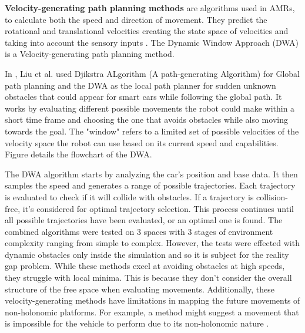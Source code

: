 \textbf{Velocity-generating path planning methods} are algorithms used in AMRs, to calculate both 
the speed and direction of movement. They predict the rotational and translational velocities 
creating the state space of velocities and taking into account the sensory inputs \cite{R28}. 
The Dynamic Window Approach (DWA) is a Velocity-generating path planning method.

In \cite{R19}, Liu et al. used Djikstra ALgorithm (A path-generating Algorithm) 
for Global path planning and 
the DWA as the local path planner for sudden unknown obstacles that could 
appear for smart cars while following the global path.
It works by evaluating different possible movements the robot could make within a short time frame 
and choosing the one that avoids obstacles while also moving towards the goal. The "window" refers 
to a limited set of possible velocities of the velocity space the robot can use based on its current 
speed and capabilities. Figure  details the flowchart of the DWA. 

The DWA algorithm starts by analyzing the car's position and base data. It then samples the speed and 
generates a range of possible trajectories. Each trajectory is evaluated to check if it will collide with 
obstacles. If a trajectory is collision-free, it's considered for optimal trajectory selection. This process 
continues until all possible trajectories have been evaluated, or an optimal one is found.
The combined algorithms were tested on 3 spaces with 3 stages of environment complexity ranging from 
simple to complex. However, the tests were effected with dynamic obstacles only inside the simulation and
so it is subject for the reality gap problem.
While these methods excel at avoiding obstacles at high speeds, they struggle with local minima. This is 
because they don't consider the overall structure of the free space when evaluating movements.
Additionally, these velocity-generating methods have limitations in mapping the future movements of 
non-holonomic platforms. For example, a method might suggest a movement that is impossible for the 
vehicle to perform due to its non-holonomic nature \cite{R28}.

